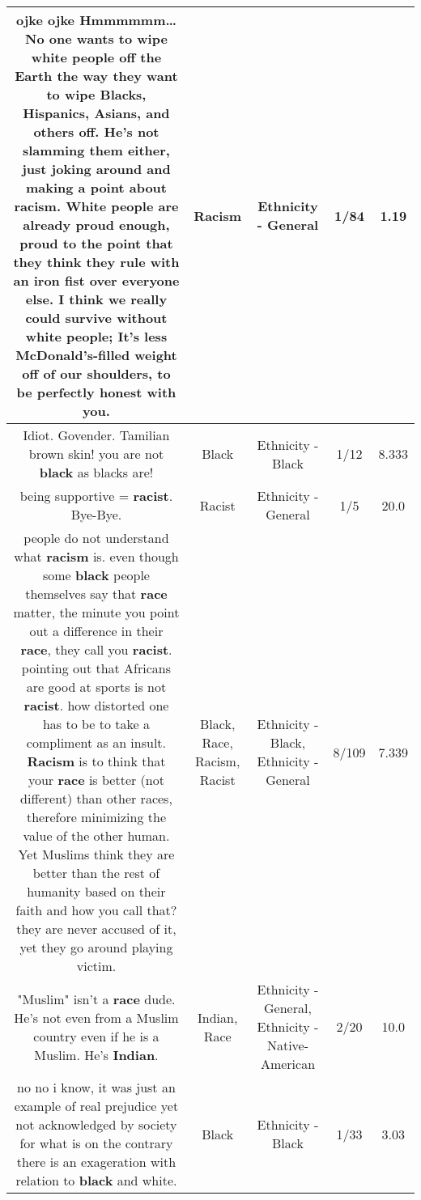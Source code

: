\documentclass[11pt]{article}
\newlength\mylength
\begin{document}
\begin{center}
\begin{longtable}{|C{.65\mylength}|C{.30\mylength}|C{.12\mylength}|C{.12\mylength}|C{.12\mylength}|}
  \small ojke ojke Hmmmmmm… No one wants to wipe white people off the Earth the way they want to wipe Blacks, Hispanics, Asians, and others off. He's not slamming them either, just joking around and making a point about \textbf{racism}. White people are already proud enough, proud to the point that they think they rule with an iron fist over everyone else. I think we really could survive without white people; It's less McDonald's-filled weight off of our shoulders, to be perfectly honest with you.\normalsize   & Racism & Ethnicity - General & 1/84 & 1.19 \\  \hline
  \small Idiot. Govender. Tamilian brown skin! you are not \textbf{black} as blacks are!\normalsize   & Black & Ethnicity - Black & 1/12 & 8.333 \\  \hline
  \small being supportive = \textbf{racist}. Bye-Bye.\normalsize   & Racist & Ethnicity - General & 1/5 & 20.0 \\  \hline
  \small people do not understand what \textbf{racism} is.  even though some \textbf{black} people themselves say that \textbf{race} matter, the minute you point out a difference in their \textbf{race}, they call you \textbf{racist}.  pointing out that Africans are good at sports is not \textbf{racist}.  how distorted one has to be to take a compliment as an insult.  \textbf{Racism} is to think that your \textbf{race} is  better (not different) than other races, therefore minimizing the value of the other human. Yet Muslims think they are better than the rest of humanity based on their faith and how you call that?  they are never accused of it, yet they go around playing victim.\normalsize   & Black, Race, Racism, Racist & Ethnicity - Black, Ethnicity - General & 8/109 & 7.339 \\  \hline
  \small "Muslim" isn't a \textbf{race} dude. He's not even from a Muslim country even if he is a Muslim. He's \textbf{Indian}.\normalsize   & Indian, Race & Ethnicity - General, Ethnicity - Native-American & 2/20 & 10.0 \\  \hline
  \small no no i know, it was just an example of real prejudice yet not acknowledged by society for what is on the contrary there is an exageration with relation to \textbf{black} and white.\normalsize   & Black & Ethnicity - Black & 1/33 & 3.03 \\  \hline

\end{longtable}
\end{center}
\end{document}
